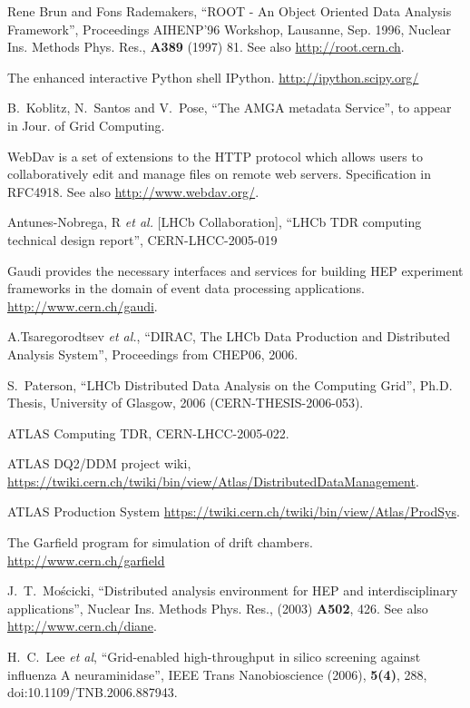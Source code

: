 \documentclass{elsart}
\begin{document}
\begin{thebibliography}{00}
  Rene Brun and Fons Rademakers, ``ROOT - An Object Oriented Data Analysis
  Framework'', Proceedings AIHENP'96 Workshop, Lausanne, Sep. 1996, Nuclear
  Ins. Methods Phys. Res., {\bf A389} (1997) 81. See also
  \url{http://root.cern.ch}.

 The enhanced interactive Python shell IPython.
  \url{http://ipython.scipy.org/}

 B.~Koblitz, N.~Santos and V.~Pose, ``The AMGA metadata
  Service'', to appear in Jour. of Grid Computing.

 WebDav is a set of extensions to the HTTP protocol which
  allows users to collaboratively edit and manage files on remote web servers.
  Specification in RFC4918. See also \url{http://www.webdav.org/}.

    Antunes-Nobrega, R {\it et al.} [LHCb Collaboration],
  ``LHCb TDR computing technical design report'', CERN-LHCC-2005-019

  Gaudi provides the necessary interfaces and services for building HEP
  experiment frameworks in the domain of event data processing
  applications. \url{http://www.cern.ch/gaudi}.

  A.Tsaregorodtsev {\it et al.}, ``DIRAC, The LHCb Data Production and
  Distributed Analysis System'', Proceedings from CHEP06, 2006.

  S.~Paterson, ``LHCb Distributed Data Analysis on the Computing Grid'', Ph.D.
  Thesis, University of Glasgow, 2006 (CERN-THESIS-2006-053).

  ATLAS Computing TDR, CERN-LHCC-2005-022.

  ATLAS DQ2/DDM project wiki, 
  \url{https://twiki.cern.ch/twiki/bin/view/Atlas/DistributedDataManagement}.

  ATLAS Production System
  \url{https://twiki.cern.ch/twiki/bin/view/Atlas/ProdSys}.

  The Garfield program for simulation of drift chambers.
  \url{http://www.cern.ch/garfield}

 J.~T.~Mo{\'s}cicki, ``Distributed analysis environment for
  HEP and interdisciplinary applications'', Nuclear Ins. Methods Phys. Res.,
  (2003) {\bf A502}, 426. See also
  \url{http://www.cern.ch/diane}.

  H.~C.~Lee {\it et al}, ``Grid-enabled high-throughput in silico screening
  against influenza A neuraminidase'', IEEE Trans Nanobioscience (2006), 
  {\bf 5(4)}, 288, doi:10.1109/TNB.2006.887943.


\end{thebibliography}
\end{document}
